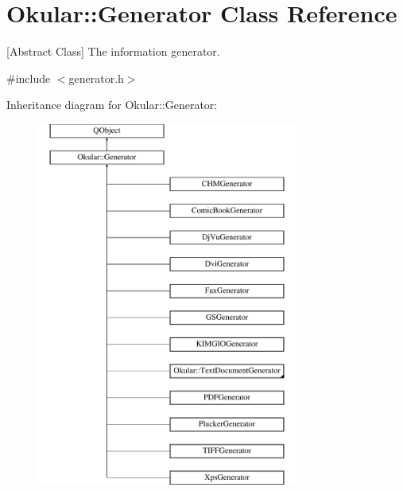 \hypertarget{classOkular_1_1Generator}{\section{Okular\+:\+:Generator Class Reference}
\label{classOkular_1_1Generator}
}


\mbox{[}Abstract Class\mbox{]} The information generator.  




{\ttfamily \#include $<$generator.\+h$>$}

Inheritance diagram for Okular\+:\+:Generator\+:\begin{figure}[H]
\begin{center}
\leavevmode
\includegraphics[height=12.000000cm]{classOkular_1_1Generator}
\end{center}
\end{figure}
